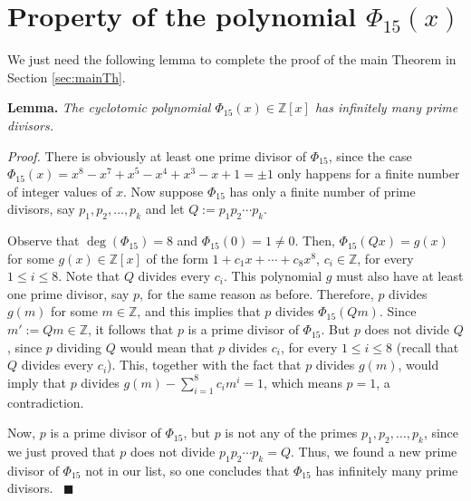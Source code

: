 \documentclass[a4paper, 12pt]{article}
\theoremstyle{definition}
\newcommand{\Z}{\mathbb{Z}}
\DeclareMathOperator{\degpol}{deg} %
\begin{document}
\section{Property of the polynomial \texorpdfstring{$\Phi_{15}(x)$}{Pkx}}\label{sec:properties}

We just need the following lemma to complete the proof of the main Theorem in Section \ref{sec:mainTh}.

\textbf{Lemma.} \emph{The cyclotomic polynomial $\Phi_{15}(x)\in\Z[x]$ has infinitely many prime divisors.}

\textit{Proof.} There is obviously at least one prime divisor of $\Phi_{15}$, since the case $\Phi_{15}(x)=x^{8} - x^{7} + x^{5} - x^{4} + x^{3} - x + 1=\pm 1$ only happens for a finite number of integer values of $x$. Now suppose $\Phi_{15}$ has only a finite number of prime divisors, say $p_1, p_2,\dots,p_k$ and let $Q:=p_1p_2\cdots p_k$. 

Observe that $\degpol(\Phi_{15})=8$ and $\Phi_{15}(0)=1\neq 0$. Then, $\Phi_{15}(Qx)=g(x)$ for some $g(x)\in\Z[x]$ of the form $1+c_1x+\cdots+c_{8}x^{8}$, $c_i\in\Z$, for every $1\leqslant i \leqslant 8$. Note that $Q$ divides every $c_i$. This polynomial $g$ must also have at least one prime divisor, say $p$, for the same reason as before. Therefore, $p$ divides $g(m)$ for some $m\in\Z$, and this implies that $p$ divides $\Phi_{15}(Qm)$. Since $m':=Qm\in\Z$, it follows that $p$ is a prime divisor of $\Phi_{15}$. But $p$ does not divide $Q$, since $p$ dividing $Q$ would mean that $p$ divides $c_i$, for every $1\leqslant i \leqslant 8$ (recall that $Q$ divides every $c_i$). This, together with the fact that $p$ divides $g(m)$, would imply that $p$ divides $g(m) - \sum_{i=1}^{8}c_im^i=1$, which means $p=1$, a contradiction. 

Now, $p$ is a prime divisor of $\Phi_{15}$, but $p$ is not any of the primes $p_1,p_2,\dots,p_k$, since we just proved that $p$ does not divide $p_1p_2\cdots p_k=Q$. Thus, we found a new prime divisor of $\Phi_{15}$ not in our list, so one concludes that $\Phi_{15}$ has infinitely many prime divisors. \ $\blacksquare$
\end{document}
